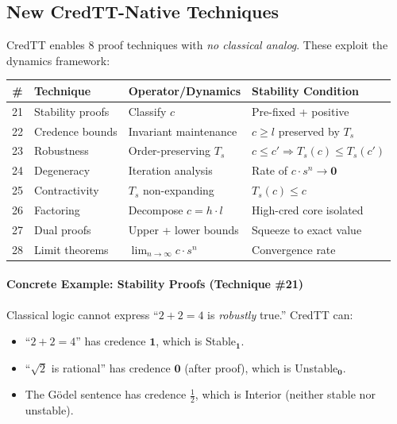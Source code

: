 \documentclass[11pt,a4paper]{article}
\newcommand{\one}{\mathbf{1}}
\newcommand{\zero}{\mathbf{0}}
\begin{document}
\subsection{New CredTT-Native Techniques}

CredTT enables 8 proof techniques with \emph{no classical analog}. These exploit the dynamics framework:

\begin{center}
\small
\begin{tabular}{|c|l|l|l|}
\hline
\textbf{\#} & \textbf{Technique} & \textbf{Operator/Dynamics} & \textbf{Stability Condition} \\
\hline
21 & Stability proofs & Classify $c$ & Pre-fixed + positive \\
22 & Credence bounds & Invariant maintenance & $c \geq l$ preserved by $T_s$ \\
23 & Robustness & Order-preserving $T_s$ & $c \leq c' \Rightarrow T_s(c) \leq T_s(c')$ \\
24 & Degeneracy & Iteration analysis & Rate of $c \cdot s^n \to \zero$ \\
25 & Contractivity & $T_s$ non-expanding & $T_s(c) \leq c$ \\
26 & Factoring & Decompose $c = h \cdot l$ & High-cred core isolated \\
27 & Dual proofs & Upper + lower bounds & Squeeze to exact value \\
28 & Limit theorems & $\lim_{n \to \infty} c \cdot s^n$ & Convergence rate \\
\hline
\end{tabular}
\end{center}

\paragraph{Concrete Example: Stability Proofs (Technique \#21)}
Classical logic cannot express ``$2+2=4$ is \emph{robustly} true.'' CredTT can:
\begin{itemize}
    \item ``$2+2=4$'' has credence $\one$, which is Stable$_\one$.
    \item ``$\sqrt{2}$ is rational'' has credence $\zero$ (after proof), which is Unstable$_\zero$.
    \item The G\"odel sentence has credence $\tfrac{1}{2}$, which is Interior (neither stable nor unstable).
\end{itemize}
\end{document}
